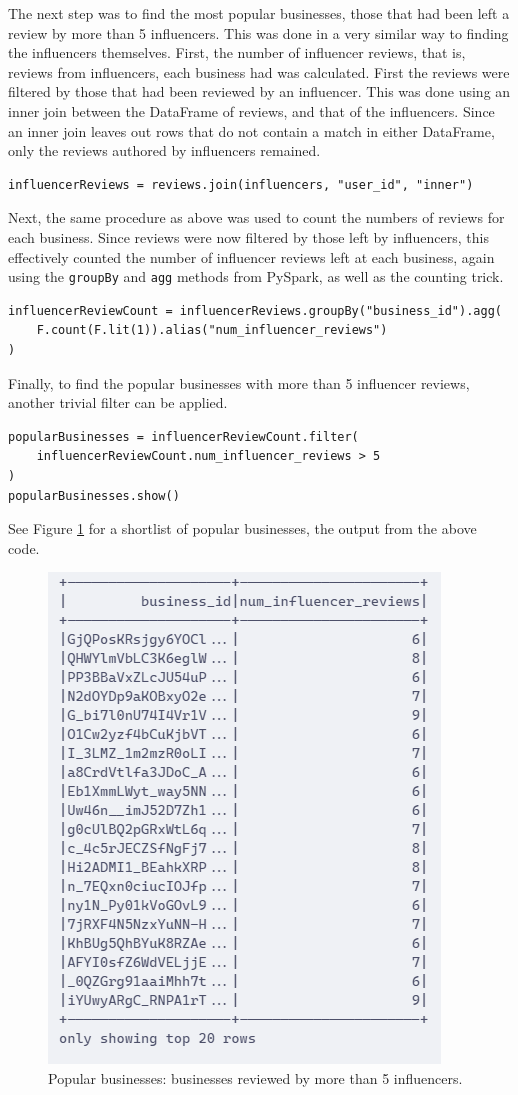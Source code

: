 The next step was to find the most popular businesses, those that had been left a review by more than 5 influencers. This was done in a very similar way to finding the influencers themselves. First, the number of influencer reviews, that is, reviews from influencers, each business had was calculated. First the reviews were filtered by those that had been reviewed by an influencer. This was done using an inner join between the DataFrame of reviews, and that of the influencers. Since an inner join leaves out rows that do not contain a match in either DataFrame, only the reviews authored by influencers remained. 

\begin{verbatim}
influencerReviews = reviews.join(influencers, "user_id", "inner")
\end{verbatim}

Next, the same procedure as above was used to count the numbers of reviews for each business. Since reviews were now filtered by those left by influencers, this effectively counted the number of influencer reviews left at each business, again using the \texttt{groupBy} and \texttt{agg} methods from PySpark, as well as the counting trick.

\begin{verbatim}
influencerReviewCount = influencerReviews.groupBy("business_id").agg(
    F.count(F.lit(1)).alias("num_influencer_reviews")
)
\end{verbatim}

Finally, to find the popular businesses with more than 5 influencer reviews, another trivial filter can be applied.

\begin{verbatim}
popularBusinesses = influencerReviewCount.filter(
    influencerReviewCount.num_influencer_reviews > 5
)
popularBusinesses.show()
\end{verbatim}

See Figure \ref{fig:popular_businesses} for a shortlist of popular businesses, the output from the above code.

\begin{figure}
    \centering
    \includegraphics[width=0.5\linewidth]{images/popular_businesses.png}
    \caption{Popular businesses: businesses reviewed by more than 5 influencers.}
    \label{fig:popular_businesses}
\end{figure}


